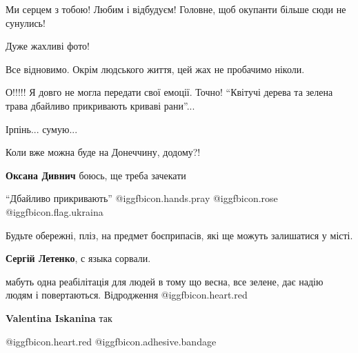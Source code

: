  
 
 
 
 
\qqSecCmt

\begin{itemize} %

Ми серцем з тобою! Любим і відбудуєм! Головне, щоб окупанти більше сюди не
сунулись!


Дуже жахливі фото!

Все відновимо. Окрім людського життя, цей жах не пробачимо ніколи.

О!!!!! Я довго не могла передати свої емоції.
Точно!
\enquote{Квітучі дерева та зелена трава дбайливо прикривають криваві рани}...

Ірпінь... сумую...

Коли вже можна буде на Донеччину, додому?!

\textbf{Оксана Дивнич} боюсь, ще треба зачекати

\enquote{Дбайливо прикривають}  @igg{fbicon.hands.pray}  @igg{fbicon.rose} @igg{fbicon.flag.ukraina}

Будьте обережні, пліз, на предмет боєприпасів, які ще можуть залишатися у місті.

\textbf{Сергій Летенко}, с языка сорвали.


мабуть одна реабілітація для людей в тому що весна, все зелене, дає надію людям
і повертаються. Відродження @igg{fbicon.heart.red}

\textbf{Valentina Iskanina} так

@igg{fbicon.heart.red} @igg{fbicon.adhesive.bandage} 

\end{itemize} %
